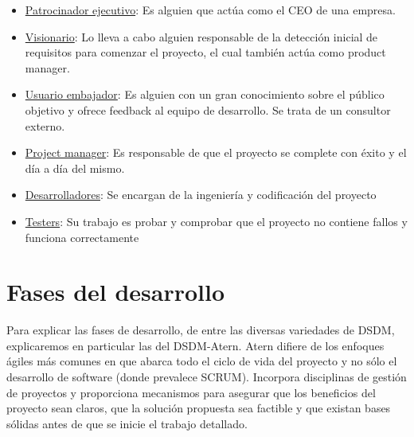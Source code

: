 \documentclass[12pt,a4paper]{article}
\begin{document}
\begin{itemize}
	\item \underline{Patrocinador ejecutivo}: Es alguien que actúa como el CEO de una empresa.
	\item \underline{Visionario}: Lo lleva a cabo alguien responsable de la detección inicial de requisitos para comenzar el proyecto, el cual también actúa como product manager.
	\item \underline{Usuario embajador}: Es alguien con un gran conocimiento sobre el público objetivo y ofrece feedback al equipo de desarrollo. Se trata de un consultor externo.
	\item \underline{Project manager}: Es responsable de que el proyecto se complete con éxito y el día a día del mismo.
	\item \underline{Desarrolladores}: Se encargan de la ingeniería y codificación del proyecto
	\item \underline{Testers}: Su trabajo es probar y comprobar que el proyecto no contiene fallos y funciona correctamente
\end{itemize}



\section{Fases del desarrollo}
Para explicar las fases de desarrollo, de entre las diversas variedades de DSDM, explicaremos en particular las del DSDM-Atern. Atern difiere de los enfoques ágiles más comunes en que abarca todo el ciclo de vida del proyecto y no sólo el desarrollo de software (donde prevalece SCRUM). Incorpora disciplinas de gestión de proyectos y proporciona mecanismos para asegurar que los beneficios del proyecto sean claros, que la solución propuesta sea factible y que existan bases sólidas antes de que se inicie el trabajo detallado.
\end{document}
